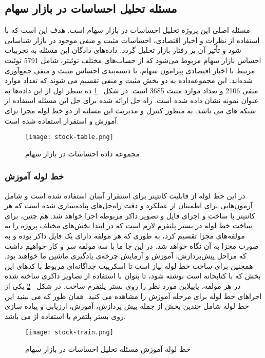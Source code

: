 \subsection{مسئله تحلیل احساسات در بازار سهام}

مسئله اصلی این پروژه تحلیل احساسات در بازار سهام است. هدف این است که با استفاده از نظرات و اخبار اقتصادی، احساسات مثبت و منفی موجود در بازار شناسایی شود و تأثیر آن بر رفتار بازار تحلیل گردد. داده‌های دادگان این مسئله به تجربیات احساس بازار سهام مربوط می‌شود  که از حساب‌های مختلف توئیتر، شامل 5791 توئیت مرتبط با اخبار اقتصادی پیرامون سهام، با دسته‌بندی احساس مثبت و منفی جمع‌آوری شده‌اند. این مجموعه‌داده به دو بخش مثبت و منفی تقسیم می شوند که تعداد موارد منفی 2106 و تعداد موارد مثبت 3685 است. در شکل 
~\ref{fig: stock data}
 ده سطر اول از این داده‌ها به عنوان نمونه نشان داده شده است. راه حل ارائه شده برای حل این مسئله استفاده از شبکه های  می باشد. به منظور کنترل و مدیریت این مسلئه از دو خط لوله مجزا برای آموزش و استقرار استفاده شده است. 
\begin{figure}[!b]
	\centering
	\texttt{[image: stock-table.png]}
	\caption{مجموعه داده احساسات در بازار سهام}
	\label{fig: stock data}
\end{figure}

\subsubsection{خط لوله آموزش}
در این خط لوله از قابلیت کانتینر برای استقرار آسان استفاده شده است و شامل آزمون‌هایی برای اطمینان از عملکرد و دقت راه‌حل‌های پیاده‌سازی شده است که هر کانتینر با ساخت و اجرای فایل و تصویر داکر مربوطه اجرا خواهد شد. هم چنین،‌ برای ساخت خط لوله در بستر پلتفرم لازم است که در ابتدا بخش‌های مختلف پروژه را به مولفه‌های مجزا تقسیم کرد، به طوری که هر مولفه دارای یک فایل داکر بوده و به صورت مجزا به آن نگاه خواهد شد. در این جا ما با سه مولفه سر و کار خواهیم داشت که مراحل پیش‌پردازش، آموزش و آزمایش چرخه‌ی یادگیری ماشین ما خواهند بود. همچنین برای ساخت خط لوله نیاز است تا اسکریپت جداگانه‌ای مربوط با کدهای این بخش که با کتابخانه  است نوشته شود، تا بتوان با استفاده از تصاویر داکری ساخته شده در هر مولفه، پایپلاین مورد نظر را روی بستر پلتفرم  ساخت. در شکل 
~\ref{fig: stock train}
یکی از اجراهای خط لوله  برای مرحله آموزش را مشاهده می کنید. همان طور که می بینید این خط لوله شامل چندین بخش از جمله پیش پردازش،‌ آموزش،‌ ارزیابی و پیاده سازی روی بستر پلتفرم  با استفاده از  می باشد.
\begin{figure}[!t]
	\centering
	\texttt{[image: stock-train.png]}
	\caption{خط لوله آموزش مسئله تحلیل احساسات در بازار سهام}
	\label{fig: stock train}
\end{figure}

